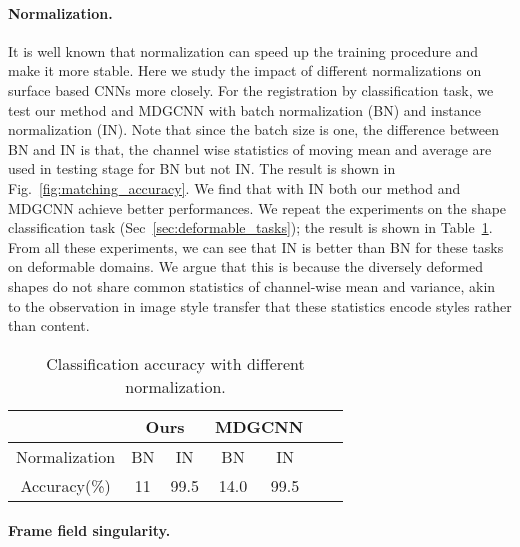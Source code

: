\documentclass[10pt,twocolumn,letterpaper]{article}
\begin{document}
\paragraph{Normalization.}
It is well known that normalization can speed up the training procedure and make it more stable.
Here we study the impact of different normalizations on surface based CNNs more closely.
For the registration by classification task, we test our method and MDGCNN with batch normalization (BN) and instance normalization (IN). 
Note that since the batch size is one, the difference between BN and IN is that, the channel wise statistics of moving mean and average are used in testing stage for BN but not IN.
The result is shown in Fig.~\ref{fig:matching_accuracy}. 
We find that with IN both our method and MDGCNN achieve better performances.
We repeat the experiments on the shape classification task (Sec~\ref{sec:deformable_tasks}); the result is shown in Table~\ref{tab:ablation_normalization}. 
From all these experiments, we can see that IN is better than BN for these tasks on deformable domains. 
We argue that this is because the diversely deformed shapes do not share common statistics of channel-wise mean and variance, akin to the observation in image style transfer \cite{perez2018film,Dumoulin2016ALR,huang2017arbitrary} that these statistics encode styles rather than content.


\begin{table}
	\caption{Classification accuracy with different normalization.}
	\label{tab:ablation_normalization}
	\vspace{0mm}
	\footnotesize
	\centering
	\begin{tabular}{|c|c|c|c|c|c|c|}
		\hline
		 & \multicolumn{2}{|c|}{Ours} & \multicolumn{2}{|c|}{MDGCNN} \\ \hline
		Normalization & BN & IN & BN &  IN \\ \hline
		Accuracy(\%) & 11 & 99.5 & 14.0  & 99.5  \\ \hline
	\end{tabular}
	\vspace{-3mm}
\end{table}

\vspace{-3mm}
\paragraph{Frame field singularity.}
\end{document}
